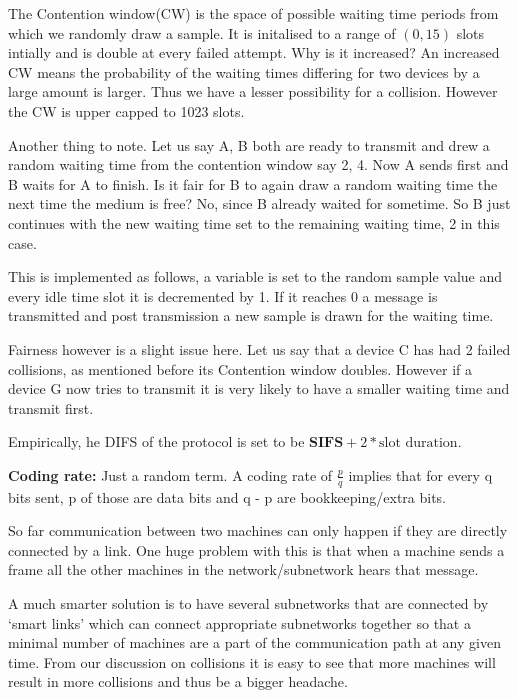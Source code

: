 \documentclass[12pt]{article}
\newcommand{\tbox}[1]{\noindent\fbox{\parbox{\textwidth}{#1}}}
\begin{document}
The Contention window(CW) is the space of possible waiting time periods from which we randomly draw a sample. 
It is initalised to a range of \((0,15)\) slots intially and is double at every failed attempt. 
Why is it increased? An increased CW means the probability of the waiting times differing for two devices by a large amount is larger. Thus 
we have a lesser possibility for a collision. However the CW is upper capped to 1023 slots. 

Another thing to note. Let us say A, B both are ready to transmit and drew a random waiting time from the 
contention window say 2, 4. Now A sends first and B waits for A to finish. Is it fair for B to again draw a random waiting time the 
next time the medium is free? No, since B already waited for sometime. So B just continues with the new waiting time set to the remaining
waiting time, 2 in this case. 


This is implemented as follows, a variable is set to the random sample value and every idle time slot it is decremented by 1. 
If it reaches 0 a message is transmitted and post transmission a new sample is drawn for the waiting time. 

Fairness however is a slight issue here. Let us say that a device C has had 2 failed collisions, as mentioned before its Contention window doubles. 
However if a device G now tries to transmit it is very likely to have a smaller waiting time and transmit first. 


Empirically, he DIFS of the protocol is set to be \(\textbf{SIFS} + 2*\text{slot duration}\). 


\textbf{Coding rate:} Just a random term. A coding rate of \(\frac{p}{q}\) implies that for every q bits sent, p of those are data bits and 
q - p are bookkeeping/extra bits. 

\noindent\tbox{
    \begin{center}
    \textbf{\Huge Lecture 18}
    \end{center}
}



So far communication between two machines can only happen if they 
are directly connected by a link. One huge problem with this is that when a machine sends a frame 
all the other machines in the network/subnetwork hears that message. 

A much smarter solution is to have several subnetworks that are connected by `smart links' which can connect appropriate subnetworks together 
so that a minimal number of machines are a part of the communication path at any given time. From our 
discussion on collisions it is easy to see that more machines will result in more collisions and thus be a bigger headache. 
\end{document}
